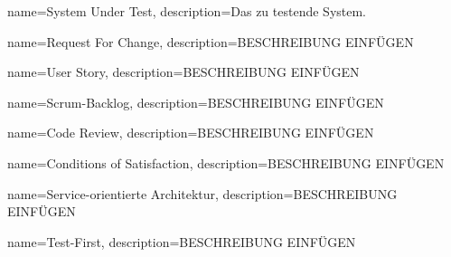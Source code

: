  {
	name={System Under Test},
	description={Das zu testende System.}
}

 {
	name={Request For Change},
	description={BESCHREIBUNG EINFÜGEN}
}

 {
	name={User Story},
	description={BESCHREIBUNG EINFÜGEN}
}

 {
	name={Scrum-Backlog},
	description={BESCHREIBUNG EINFÜGEN}
}

 {
	name={Code Review},
	description={BESCHREIBUNG EINFÜGEN}
}

 {
	name={Conditions of Satisfaction},
	description={BESCHREIBUNG EINFÜGEN}
}

 {
	name={Service-orientierte Architektur},
	description={BESCHREIBUNG EINFÜGEN}
}

 {
	name={Test-First},
	description={BESCHREIBUNG EINFÜGEN}
}
